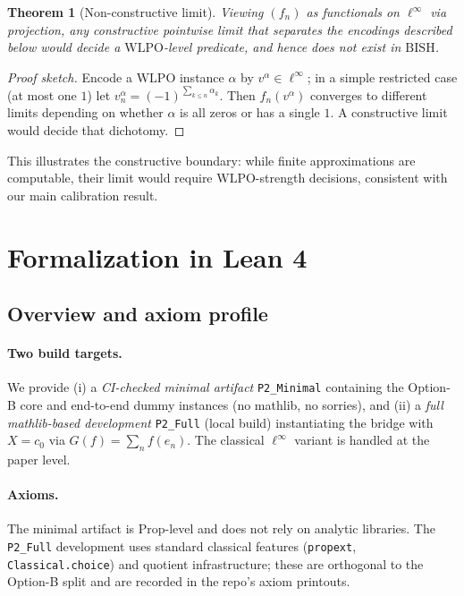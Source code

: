 \documentclass[11pt]{article}  %
\newtheorem{theorem}{Theorem}[section]
\newenvironment{thm}{\begin{theorem}}{\end{theorem}}
\newtheorem{theorem}{Theorem}[section]
\newenvironment{thm}{\begin{theorem}}{\end{theorem}}
\newcommand{\linf}{\ell^\infty}
\newcommand{\WLPO}{\mathrm{WLPO}}
\newcommand{\BISH}{\mathrm{BISH}}
\begin{document}
\begin{thm}[Non-constructive limit]
Viewing $(f_n)$ as functionals on $\linf$ via projection, any constructive pointwise limit that separates the encodings described below would decide a $\WLPO$-level predicate, and hence does not exist in $\BISH$.
\end{thm}

\begin{proof}[Proof sketch]
Encode a $\WLPO$ instance $\alpha$ by $v^\alpha\in\linf$; in a simple restricted case (at most one $1$) let $v^\alpha_n=(-1)^{\sum_{k\le n}\alpha_k}$. Then $f_n(v^\alpha)$ converges to different limits depending on whether $\alpha$ is all zeros or has a single $1$. A constructive limit would decide that dichotomy.
\end{proof}

This illustrates the constructive boundary: while finite approximations are computable, their limit would require $\WLPO$-strength decisions, consistent with our main calibration result.

\section{Formalization in Lean 4}\label{sec:lean}

\subsection{Overview and axiom profile}\label{sec:axioms}

\paragraph{Two build targets.}
We provide (i) a \emph{CI-checked minimal artifact} \texttt{P2\_Minimal} containing the Option-B core and end-to-end dummy instances (no mathlib, no sorries), and (ii) a \emph{full mathlib-based development} \texttt{P2\_Full} (local build) instantiating the bridge with $X=c_0$ via $G(f)=\sum_n f(e_n)$.  The classical $\ell^\infty$ variant is handled at the paper level.

\paragraph{Axioms.}
The minimal artifact is Prop-level and does not rely on analytic libraries.  The \texttt{P2\_Full} development uses standard classical features
(\texttt{propext}, \texttt{Classical.choice}) and quotient infrastructure; these are orthogonal to the Option-B split and are recorded in the repo's axiom printouts.
\end{document}
